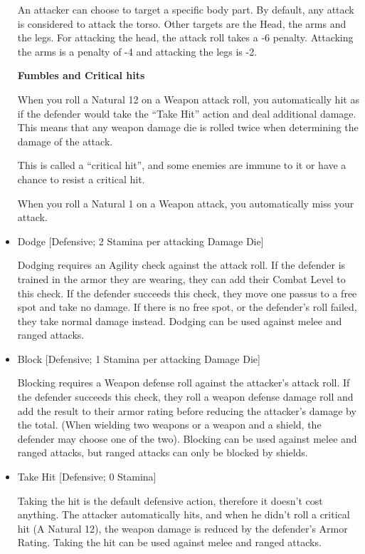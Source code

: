 \begin{itemize}
An attacker can choose to target a specific body part. By default, any attack is considered to attack the torso. Other targets are the Head, the arms and the legs. For attacking the head, the attack roll takes a -6 penalty. Attacking the arms is a penalty of -4 and attacking the legs is -2.



\textbf{Fumbles and Critical hits}

When you roll a Natural 12 on a Weapon attack roll, you automatically hit as if the defender would take the “Take Hit” action and deal additional damage. This means that any weapon damage die is rolled twice when determining the damage of the attack.

This is called a “critical hit”, and some enemies are immune to it or have a chance to resist a critical hit.

When you roll a Natural 1 on a Weapon attack, you automatically miss your attack.



\item Dodge [Defensive; 2 Stamina per attacking Damage Die]

Dodging requires an Agility check against the attack roll. If the defender is trained in the armor they are wearing, they can add their Combat Level to this check. If the defender succeeds this check, they move one passus to a free spot and take no damage. If there is no free spot, or the defender’s roll failed, they take normal damage instead. Dodging can be used against melee and ranged attacks.



\item Block [Defensive; 1 Stamina per attacking Damage Die]

Blocking requires a Weapon defense roll against the attacker's attack roll. If the defender succeeds this check, they roll a weapon defense damage roll and add the result to their armor rating before reducing the attacker’s damage by the total. (When wielding two weapons or a weapon and a shield, the defender may choose one of the two). Blocking can be used against melee and ranged attacks, but ranged attacks can only be blocked by shields.



\item Take Hit [Defensive; 0 Stamina]

Taking the hit is the default defensive action, therefore it doesn’t cost anything. The attacker automatically hits, and when he didn’t roll a critical hit (A Natural 12), the weapon damage is reduced by the defender’s Armor Rating. Taking the hit can be used against melee and ranged attacks.




\end{itemize}
